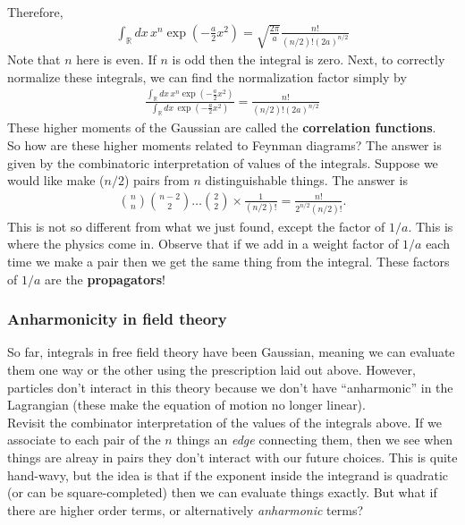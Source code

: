 \documentclass{book}
\theoremstyle{definition}
\newcommand{\f}[2]{\frac{#1}{#2}}
\newcommand{\lp}{\left(}
\newcommand{\rp}{\right)}
\begin{document}
Therefore,
\begin{align}
\boxed{\int_\mathbb{R}dx\, x^n \exp\lp -\f{a}{2}x^2\rp 
= \sqrt{\f{2\pi}{a}}\f{n!}{(n/2)!(2a)^{n/2}}}
\end{align}
Note that $n$ here is even. If $n$ is odd then the integral is zero. Next, to correctly normalize these integrals, we can find the normalization factor simply by
\begin{align}
\boxed{\f{\int_\mathbb{R}dx\, x^n \exp\lp -\f{a}{2}x^2\rp }{\int_\mathbb{R}dx\, \exp\lp -\f{a}{2}x^2\rp } = \f{n!}{(n/2)!(2a)^{n/2}}}
\end{align}
These higher moments of the Gaussian are called the \textbf{correlation functions}. 	 \\

So how are these higher moments related to Feynman diagrams? The answer is given by the combinatoric interpretation of values of the integrals. Suppose we would like make ($n/2$) pairs from $n$ distinguishable things. The answer is 
\begin{align}
{ n \choose n}{n-2 \choose 2}\dots {2 \choose 2} \times \f{1}{(n/2)!} = \f{n!}{2^{n/2}(n/2)!}.
\end{align}
This is not so different from what we just found, except the factor of $1/a$. This is where the physics come in. Observe that if we add in a weight factor of $1/a$ each time we make a pair then we get the same thing from the integral. These factors of $1/a$ are the \textbf{propagators}! 









\subsubsection{Anharmonicity in field theory}

So far, integrals in free field theory have been Gaussian, meaning we can evaluate them one way or the other using the prescription laid out above. However, particles don't interact in this theory because we don't have ``anharmonic'' in the Lagrangian (these make the equation of motion no longer linear). \\

Revisit the combinator interpretation of the values of the integrals above. If we associate to each pair of the $n$ things an \textit{edge} connecting them, then we see when things are alreay in pairs they don't interact with our future choices. This is quite hand-wavy, but the idea is that if the exponent inside the integrand is quadratic (or can be square-completed) then we can evaluate things exactly. But what if there are higher order terms, or alternatively \textit{anharmonic} terms? \\
\end{document}
